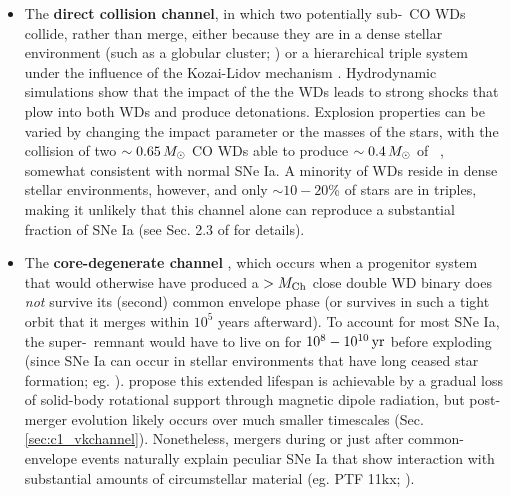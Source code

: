 \begin{itemize}
	\item The {\bf direct collision channel}, in which two potentially sub-\Mch\ CO WDs collide, rather than merge, either because they are in a dense stellar environment (such as a globular cluster; \citealt{benzth89, loreig10}) or a hierarchical triple system \citep{katzd12} under the influence of the Kozai-Lidov mechanism \citep{koza62, lido62}.  Hydrodynamic simulations \citep{rask+10, kush+13, garc+13} show that the impact of the the WDs leads to strong shocks that plow into both WDs and produce detonations.  Explosion properties can be varied by changing the impact parameter or the masses of the stars, with the collision of two $\sim0.65\,\Msun$ CO WDs able to produce $\sim0.4\,\Msun$ of \Ni\ \citep{garc+13, kush+13}, somewhat consistent with normal SNe Ia.  A minority of WDs reside in dense stellar environments, however, and only $\sim10-20$\% of stars are in triples, making it unlikely that this channel alone can reproduce a substantial fraction of SNe Ia (see Sec. 2.3 of \citealt{maozmn14} for details).

	\item The {\bf core-degenerate channel} \citep{livir03, kashs11, tsebs15}, which occurs when a progenitor system that would otherwise have produced a $>\Mch$ close double WD binary does \textit{not} survive its (second) common envelope phase (or survives in such a tight orbit that it merges within $10^5$ years afterward).  To account for most SNe Ia, the super-\Mch\ remnant would have to live on for $10^{8}-10^{10}\,\mathrm{yr}$ before exploding (since SNe Ia can occur in stellar environments that have long ceased star formation; eg. \citealt{prichs08, maozsg10}).  \cite{illks12} propose this extended lifespan is achievable by a gradual loss of solid-body rotational support through magnetic dipole radiation, but post-merger evolution likely occurs over much smaller timescales (Sec. \ref{sec:c1_vkchannel}).  Nonetheless, mergers during or just after common-envelope events naturally explain peculiar SNe Ia that show interaction with substantial amounts of circumstellar material (eg. PTF 11kx; \citealt{dild+12, soke13}).

\end{itemize}


